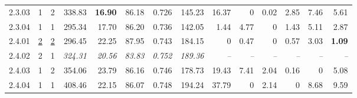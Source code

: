 \begin{table}[!t]
\begin{tabular}{@{}lllrrrrrrrrrrr@{}}
    2.3.03 & 1 & 2 & 338.83 & \textbf{16.90} & 86.18 & 0.726 & 145.23 & 16.37 & 0 & 0.02 & 2.85 & 7.46 & 5.61 \\
    2.3.04 & 1 & 1 & 295.34 & 17.70 & 86.20 & 0.736 & 142.05 & 1.44 & 4.77 & 0 & 1.43 & 5.11 & 2.87 \\
    2.4.01 & \underline{2} & \underline{2} & 296.45 & 22.25 & 87.95 & 0.743 & 184.15 & 0 & 0.47 & 0 & 0.57 & 3.03 & \textbf{1.09} \\
    2.4.02 & 2 & 1 & \textit{324.31} & \textit{20.56} & \textit{83.83} & \textit{0.752} & \textit{189.36} & \textit{--} & \textit{--} & \textit{--} & \textit{--} & \textit{--} & \textit{--} \\
    2.4.03 & 1 & 2 & 354.06 & 23.79 & 86.16 & 0.746 & 178.73 & 19.43 & 7.41 & 2.04 & 0.16 & 0 & 5.08 \\
    2.4.04 & 1 & 1 & 408.46 & 22.15 & 86.07 & 0.748 & 194.24 & 37.79 & 0 & 2.14 & 0 & 8.68 & 9.59 \\
\hline
\end{tabular}
\end{table}